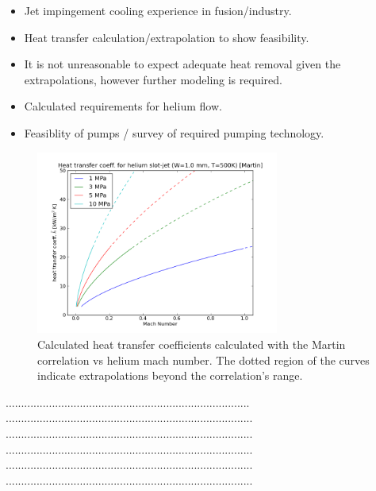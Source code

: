 \documentclass[final,3p,times,twocolumn]{elsarticle} %
\begin{document}
\begin{itemize}
\item Jet impingement cooling experience in fusion/industry.
\item Heat transfer calculation/extrapolation to show feasibility.
\item It is not unreasonable to expect adequate heat removal given the extrapolations, however further modeling is required.
\item Calculated requirements for helium flow.
\item Feasiblity of pumps / survey of required pumping technology.
\end{itemize}

\begin{figure}[htbp]
\begin{center}
\includegraphics[width=80mm]{Figures/htc vs mach number 1mm T500K.png}
\caption{Calculated heat transfer coefficients calculated with the Martin \cite{...} correlation vs helium mach number.  The dotted region of the curves indicate extrapolations beyond the correlation's range.} 
\label{fig:SRIMDPA}
\end{center}
\end{figure}

...............................................................................\\
................................................................................\\
................................................................................\\
................................................................................\\
................................................................................\\
................................................................................\\
\end{document}

